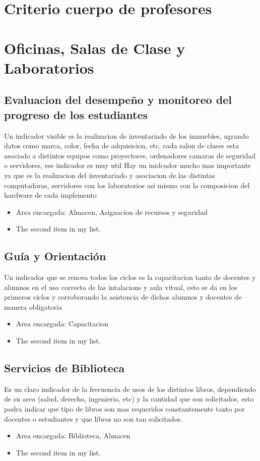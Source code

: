 \documentclass[12pt,a4paper]{report}
\begin{document}
\section{ Criterio cuerpo de profesores}


\section{ Oficinas, Salas de Clase y Laboratorios}
\subsection{Evaluacion del desempeño y monitoreo del progreso de los estudiantes}
Un indicador visible es la realizacion de inventariado de los inmuebles, agrando datos como marca, color, fecha de adquisicion, etc.
cada salon de clases esta asociado a distintos equipos como proyectores, ordenadores camaras de seguridad o servidores, ese indicador es muy util
Hay un inidcador mucho mas importante ya que es la realizacion del inventariado y asociacion de las distintas computadoras, servidores con los laboratorios asi mismo con la composicion del hardware de cada implemento
\begin{itemize}
\item Area encargada: Almacen, Asignacion de recursos y seguridad
\item The second item in my list.
\end{itemize}
\subsection{Guía y Orientación}
Un indicador que se renova todos los ciclos es la capacitacion tanto de docentes y alumnos en el uso correcto de las intalacions y aula vitual, esto se da en los primeros ciclos y corroborando la asistencia de dichos alumnos y docentes de manera obligatoria
\begin{itemize}
\item Area encargada: Capacitacion
\item The second item in my list.
\end{itemize}
\subsection{Servicios de Biblioteca}
Es un claro indicador de la frecuencia de usos de los distintos libros, dependiendo de su area (salud, derecho, ingenieria, etc) y la cantidad que son solicitados, esto podra indicar que tipo de libros son mas requeridos constantemente tanto por docentes o estudiantes y que libros no son tan solicitados.
\begin{itemize}
\item Area encargada: Biblioteca, Almacen
\item The second item in my list.
\end{itemize}
\end{document}
